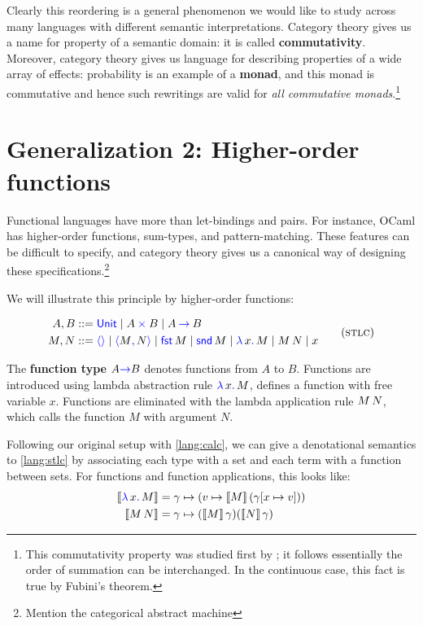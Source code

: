 Clearly this reordering is a general phenomenon we would like to study across 
many languages with different semantic interpretations.  Category theory gives
us a name for property of a semantic domain: it is called 
\textbf{commutativity}.  Moreover, category theory gives us language for
describing properties of a wide array of effects: probability is an example of a
\textbf{monad}, and this monad is commutative and hence such rewritings are
valid for \emph{all commutative monads}.\footnote{This commutativity property
was studied first by \citep{staton2017commutative}; it follows essentially the
order of summation can be interchanged. In the continuous case, this fact is
true by Fubini's theorem.}

\section{Generalization 2: Higher-order functions}
Functional languages have more than let-bindings and pairs. For instance, 
OCaml has higher-order functions, sum-types, and pattern-matching. These 
features can be difficult to specify, and category theory gives us a canonical 
way of designing these specifications.\footnote{Mention the categorical abstract machine}

We will illustrate this principle by higher-order functions:

\begin{gather}
  \begin{aligned}
   A,B &::= \plkw{Unit}
     \mid A \pltimes B
     \mid A \plto B
  \\
  M,N &::= \plunit{}
      \mid \plpair{M}{N}
      \mid \plfst{M}
      \mid \plsnd{M}
      \mid \pllam{x}{M}
      \mid \plapp{M}{N}
      \mid x
  \end{aligned}
  \label{lang:stlc}
  \tag{\textsc{stlc}}
\end{gather}

The \textbf{function type} $A \mathsf{{\color{blue}\to}} B$ denotes functions from $A$ 
to $B$. Functions are introduced using lambda abstraction rule ${\color{blue}\lambda}\,x{\color{blue}.}\,M$, defines a function 
with free variable $x$. Functions are eliminated with the lambda 
application rule $M\,N$, which calls the function $M$ with argument $N$.

Following our original setup with \ref{lang:calc}, we can give a denotational 
semantics to \ref{lang:stlc} by associating each type with a set and each 
term with a function between sets. For functions and function applications, this
looks like:
\begin{align*}
   \left\llbracket {\color{blue}\lambda}\,x{\color{blue}.}\,M\right\rrbracket &= \gamma \mapsto (v \mapsto \left\llbracket M\right\rrbracket(\gamma[x \mapsto v])) \\
  \left\llbracket M\,N\right\rrbracket &= \gamma \mapsto (\left\llbracket M\right\rrbracket\gamma)(\left\llbracket N\right\rrbracket\gamma) \\
\end{align*}

